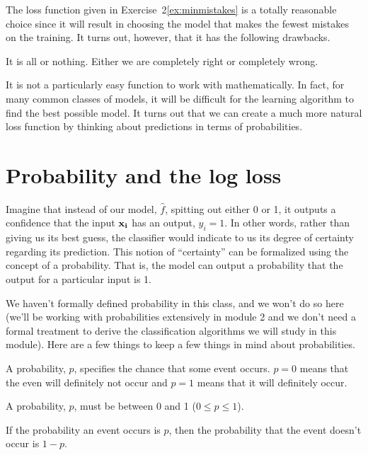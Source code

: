\documentclass[assignment03_Solutions]{subfiles}
\begin{document}
The loss function given in Exercise~2\ref{ex:minmistakes} is a totally reasonable choice since it will result in choosing the model that makes the fewest mistakes on the training.  It turns out, however, that it has the following drawbacks.
\bi
\item It is all or nothing.  Either we are completely right or completely wrong.
\item It is not a particularly easy function to work with mathematically.  In fact, for many common classes of models, it will be difficult for the learning algorithm to find the best possible model.
\ei
It turns out that we can create a much more natural loss function by thinking about predictions in terms of probabilities.

\section{Probability and the log loss}
Imagine that instead of our model, $\hat{f}$, spitting out either 0 or 1, it outputs a confidence that the input $\mathbf{x_i}$ has an output, $y_i = 1$.  In other words, rather than giving us its best guess, the classifier would indicate to us its degree of certainty regarding its prediction.  This notion of ``certainty'' can be formalized using the concept of a probability.  That is, the model can output a probability that the output for a particular input is 1.

We haven't formally defined probability in this class, and we won't do so here (we'll be working with probabilities extensively in module 2 and we don't need a formal treatment to derive the classification algorithms we will study in this module).  Here are a few things to keep a few things in mind about probabilities.
\bi
\item A probability, $p$, specifies the chance that some event occurs.  $p = 0$ means that the even will definitely not occur and $p=1$ means that it will definitely occur.
\item A probability, $p$, must be between 0 and 1 ($0 \leq p \leq 1$).
\item If the probability an event occurs is $p$, then the probability that the event doesn't occur is $1 - p$.
\ei
\end{document}
